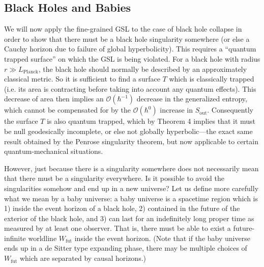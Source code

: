 \documentclass{article}
\begin{document}
\subsection{Black Holes and Babies}\label{black}

We will now apply the fine-grained GSL to the case of black hole collapse in order to show that there must be a black hole singularity somewhere (or else a Cauchy horizon due to failure of global hyperbolicity).  This requires a ``quantum trapped surface'' on which the GSL is being violated.  For a black hole with radius $r \gg L_\mathrm{Planck}$, the black hole should normally be described by an approximately classical metric.  So it is sufficient to find a surface $T$ which is classically trapped (i.e. its area is contracting before taking into account any quantum effects).  This decrease of area then implies an $\mathcal{O}(\hbar^{-1})$ decrease in the generalized entropy, which cannot be compensated for by the $\mathcal{O}(\hbar^{0})$ increase in $S_\mathrm{out}$.  Consequently the surface $T$ is also quantum trapped, which by Theorem 4 implies that it must be null geodesically incomplete, or else not globally hyperbolic---the exact same result obtained by the Penrose singularity theorem, but now applicable to certain quantum-mechanical situations.

However, just because there is a singularity somewhere does not necessarily mean that there must be a singularity everywhere.  Is it possible to avoid the singularities somehow and end up in a new universe?  Let us define more carefully what we mean by a baby universe: a baby universe is a spacetime region which is 1) inside the event horizon of a black hole, 2) contained in the future of the exterior of the black hole, and 3) can last for an indefinitely long proper time as measured by at least one observer.  That is, there must be able to exist a future-infinite worldline $W_\mathrm{fut}$ inside the event horizon.  (Note that if the baby universe ends up in a de Sitter type expanding phase, there may be multiple choices of $W_\mathrm{fut}$ which are separated by causal horizons.)
\end{document}
